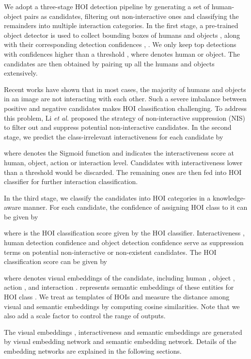 \documentclass[sigconf,screen]{acmart}
\begin{document}
We adopt a three-stage HOI detection pipeline by generating a set of human-object pairs as candidates, filtering out non-interactive ones and classifying the remainders into multiple interaction categories. In the first stage, a pre-trained object detector is used to collect bounding boxes of humans  and objects , along with their corresponding detection confidences , . We only keep top  detections with confidences  higher than a threshold , where  denotes human or object. The candidates are then obtained by pairing up all the humans and objects extensively.

Recent works have shown that in most cases, the majority of humans and objects in an image are not interacting with each other. Such a severe imbalance between positive and negative candidates makes HOI classification challenging. To address this problem, Li \textit{et al.} \cite{li2019transferable} proposed the strategy of non-interactive suppression (NIS) to filter out and suppress potential non-interactive candidates. In the second stage, we predict the class-irrelevant interactiveness  for each candidate by

where  denotes the Sigmoid function and  indicates the interactiveness score at human, object, action or interaction level. Candidates with interactiveness  lower than a threshold  would be discarded. The remaining ones are then fed into HOI classifier for further interaction classification.

In the third stage, we classify the candidates into HOI categories in a knowledge-aware manner. For each candidate, the confidence of assigning HOI class  to it can be given by

where  is the HOI classification score given by the HOI classifier. Interactiveness , human detection confidence  and object detection confidence  serve as suppression terms on potential non-interactive or non-existent candidates. The HOI classification score  can be given by

where  denotes visual embeddings of the candidate, including human , object , action , and interaction .  represents semantic embeddings of these entities for HOI class . We treat  as templates of HOIs and measure the distance among visual and semantic embeddings by computing cosine similarities. Note that we also add a scale factor  to control the range of outputs.

The visual embeddings , interactiveness  and semantic embeddings  are generated by visual embedding network and semantic embedding network. Details of the embedding networks are explained in the following sections.
\end{document}
